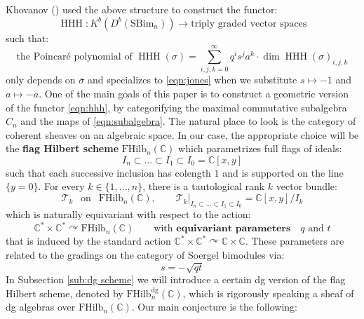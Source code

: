 \documentclass[12pt]{amsart}
\numberwithin{equation}{section}
\newtheorem{conjecture}[theorem]{Conjecture}
\theoremstyle{definition}
\theoremstyle{remark}
\DeclareMathOperator{\HHH}{HHH}
\newcommand{\CC}{\mathbb{C}}
\newcommand{\CO}{\mathcal{O}}
\newcommand{\CT}{\mathcal{T}}
\newcommand{\FT}{\mathbf{FT}}
\renewcommand{\1}{\mathbf{1}}
\newcommand{\coh}{\mathrm{Coh}}
\newcommand{\FH}{\mathrm{FHilb}}
\newcommand{\SBim}{\mathrm{SBim}}
\newcommand{\torus}{\CC^{*} \times \CC^*}
\newcommand{\dg}{\text{dg}}%
\newcommand{\edg}{\emph{dg}}
\begin{document}
Khovanov (\cite{Kh}) used the above structure to construct the functor:
\begin{equation}
\label{eqn:hhh}
\HHH:K^b(D^b(\SBim_n)) \longrightarrow \text{triply graded vector spaces}
\end{equation}
such that:
$$
\text{the Poincar\'e polynomial of }\HHH(\sigma) = \sum_{i,j,k=0}^\infty q^i s^j a^k \cdot \dim \HHH(\sigma)_{i,j,k}
$$
only depends on $\overline{\sigma}$ and specializes to \eqref{eqn:jones} when we substitute $s \mapsto -1$ and $a \mapsto -a$. One of the main goals of this paper is to construct a geometric version of the functor \eqref{eqn:hhh}, by categorifying the maximal commutative subalgebra $C_n$ and the maps of \eqref{eqn:subalgebra}. The natural place to look is the category of coherent sheaves on an algebraic space. In our case, the appropriate choice will be the \textbf{flag Hilbert scheme} $\FH_n(\CC)$ which parametrizes full flags of ideals:
$$
I_n \subset ... \subset I_1 \subset I_0 = \CC[x,y]
$$
such that each successive inclusion has colength $1$ and is supported on the line $\{y=0\}$. For every $k\in \{1,...,n\}$, there is a tautological rank $k$ vector bundle:
\begin{equation}
\label{eqn:def tautological}
\CT_k \ \ \text{ on } \ \ \FH_n(\CC), \qquad \CT_k|_{I_n \subset ... \subset I_1 \subset I_0} = \CC[x,y]/I_k
\end{equation}
which is naturally equivariant with respect to the action:
$$
\torus \curvearrowright \FH_n(\CC) \qquad \text{with }\textbf{equivariant parameters} \quad q \text{ and }t
$$
that is induced by the standard action $\torus \curvearrowright \CC \times \CC$. These parameters are related to the gradings on the category of Soergel bimodules via:
\begin{equation}
\label{eqn:matching}
s = -\sqrt{qt}
\end{equation}
In Subsection \ref{sub:dg scheme} we will introduce a certain dg version of the flag Hilbert scheme, denoted by $\FH_n^{\dg}(\CC)$, which is rigorously speaking a sheaf of dg algebras over $\FH_n(\CC)$. Our main conjecture is the following: \\


\end{document}
